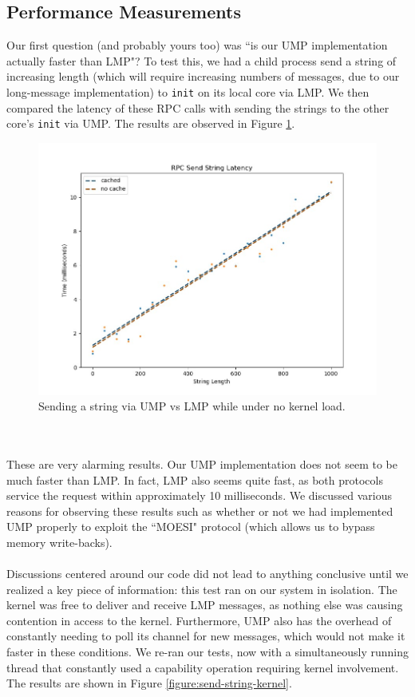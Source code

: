 \subsection{Performance Measurements}
Our first question (and probably yours too) was ``is our UMP implementation actually faster than LMP"? To test this, we had a child process send a string of increasing length (which will require increasing numbers of messages, due to our long-message implementation) to \texttt{init} on its local core via LMP. We then compared the latency of these RPC calls with sending the strings to the other core's \texttt{init} via UMP. The results are observed in Figure \ref{figure:send-string-no-kernel}.
\begin{figure}[ht]
    \centering
    \includegraphics[width=0.8\columnwidth]{images/send-string-no-kernel.png}
    \caption{Sending a string via UMP vs LMP while under no kernel load.}
    \label{figure:send-string-no-kernel}
\end{figure}
\\\\
These are very alarming results. Our UMP implementation does not seem to be much faster than LMP. In fact, LMP also seems quite fast, as both  protocols service the request within approximately 10 milliseconds. We discussed various reasons for observing these results such as whether or not we had implemented UMP properly to exploit the ``MOESI" protocol (which allows us to bypass memory write-backs). 
\\\\
Discussions centered around our code did not lead to anything conclusive until we realized a key piece of information: this test ran on our system in isolation. The kernel was free to deliver and receive LMP messages, as nothing else was causing contention in access to the kernel. Furthermore, UMP also has the overhead of constantly needing to poll its channel for new messages, which would not make it faster in these conditions. We re-ran our tests, now with a simultaneously running thread that constantly used a capability operation requiring kernel involvement. The results are shown in Figure \ref{figure:send-string-kernel}.
